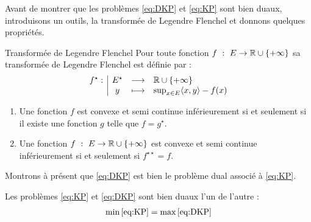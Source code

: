 \documentclass[a4paper,12pt]{article}
\begin{document}
Avant de montrer que les problèmes \eqref{eq:DKP} et \eqref{eq:KP} sont bien duaux, introduisons un outils, la transformée de Legendre Flenchel et donnons quelques propriétés. 
\begin{definition}{Transformée de Legendre Flenchel}
Pour toute fonction $f\ :\ E\rightarrow \mathbb{R}\cup\{+\infty\}$ sa transformée de Legendre Flenchel est définie par :
\begin{align}
\begin{array}[t]{l|ccl} f^{\star}: & E^{\star} & \longrightarrow &  \mathbb{R}\cup\{+\infty\} \\ & y & \longmapsto & \sup_{x\in E}\langle x,y\rangle -f(x) \end{array}
\end{align}
\end{definition}
\begin{propriete}
\begin{enumerate}
\item Une fonction $f$ est convexe et semi continue inférieurement si et seulement si il existe une fonction $g$ telle que $f=g^{\star}$.
\item Une fonction $f\ :\ E\rightarrow \mathbb{R}\cup\{+\infty\}$ est convexe et semi continue inférieurement si et seulement si $f^{\star\star}=f$.
\end{enumerate}
\end{propriete}
Montrons à présent que \eqref{eq:DKP} est bien le problème dual associé à \eqref{eq:KP}. 
\begin{theoreme}{}
\label{thh:dualite}
Les problèmes \eqref{eq:KP} et \eqref{eq:DKP} sont bien duaux l'un de l'autre :
\begin{align}
\min\eqref{eq:KP} = \max\eqref{eq:DKP}
\end{align}
\end{theoreme}
\end{document}
